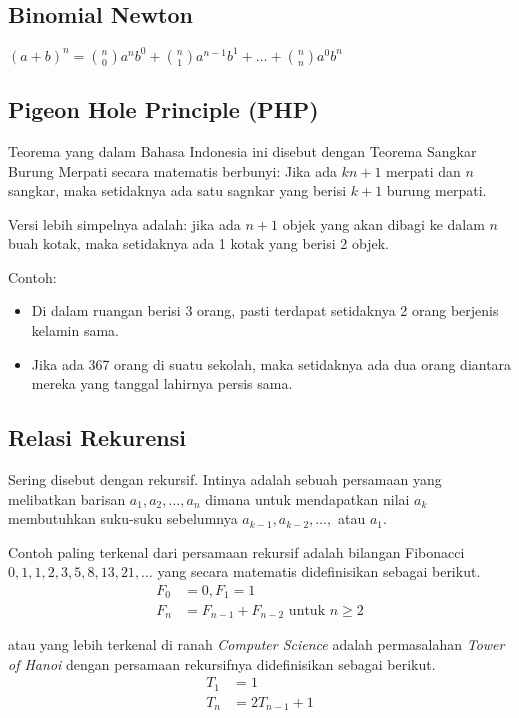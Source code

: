 \documentclass[11pt]{scrartcl}
\begin{document}
  \subsection{Binomial Newton}
     $(a+b)^n = {n \choose 0} a^nb^0 + {n \choose 1} a^{n-1}b^1+ \dots +{n \choose n}a^0b^n$
     
     
     \subsection{Pigeon Hole Principle (PHP)}
     Teorema yang dalam Bahasa Indonesia ini disebut dengan Teorema Sangkar Burung Merpati secara matematis berbunyi:
     Jika ada $kn+1$ merpati dan $n$ sangkar, maka setidaknya ada satu sagnkar yang berisi $k+1$ burung merpati.
     
     Versi lebih simpelnya adalah: jika ada $n+1$ objek yang akan dibagi ke dalam $n$ buah kotak, maka setidaknya ada 1 kotak yang berisi 2 objek.
     
     Contoh: \begin{itemize}
         \item Di dalam ruangan berisi 3 orang, pasti terdapat setidaknya 2 orang berjenis kelamin sama.
         \item Jika ada 367 orang di suatu sekolah, maka setidaknya ada dua orang diantara mereka yang tanggal lahirnya persis sama.
     \end{itemize}
     
     \subsection{Relasi Rekurensi}
     Sering disebut dengan rekursif. Intinya adalah sebuah persamaan yang melibatkan barisan $a_1, a_2, \dots , a_n$ dimana untuk mendapatkan nilai $a_k$ membutuhkan suku-suku sebelumnya $a_{k-1}, a_{k-2}, \dots,$ atau $a_1$. 
     
     Contoh paling terkenal dari persamaan rekursif adalah bilangan Fibonacci $0,1,1,2,3,5,8,13,21,\dots$ yang secara matematis didefinisikan sebagai berikut.
     \begin{align*}
         F_0 &= 0, F_1 = 1\\
         F_n &= F_{n-1}+F_{n-2} \text{ untuk } n \ge 2
     \end{align*}
     
     atau yang lebih terkenal di ranah \textit{Computer Science} adalah permasalahan \textit{Tower of Hanoi} dengan persamaan rekursifnya didefinisikan sebagai berikut.
     \begin{align*}
         T_1 &= 1 \\
         T_n &= 2T_{n-1}+1
     \end{align*}
     
\end{document}
